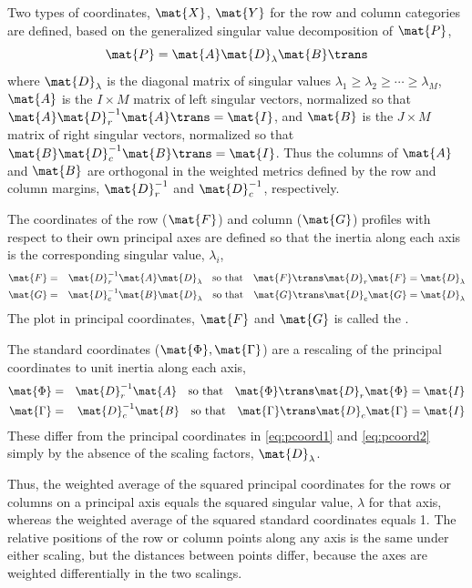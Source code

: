 \documentclass[11pt]{book}\usepackage[]{graphicx}\usepackage[]{color}
\begin{document}
Two types of coordinates, $\mat{X}$, $\mat{Y}$ for the row and column categories are defined,
based on the generalized singular value decomposition of $\mat{P}$,
\begin{equation*}%
\mat{P} = \mat{A} \mat{D}_{\lambda} \mat{B}\trans
\end{equation*}
where $\mat{D}_{\lambda}$ is the diagonal matrix of singular values
\(\lambda_1 \geq \lambda_2 \geq \cdots \geq \lambda_M\),
$\mat{A}$ is the $I \times M$ matrix of left singular vectors,
normalized so that
\( \mat{A} \mat{D}_r^{-1} \mat{A}\trans = \mat{I} \), and
$\mat{B}$ is the $J \times M$ matrix of right singular vectors,
normalized so that
\( \mat{B} \mat{D}_c^{-1} \mat{B}\trans = \mat{I} \).
Thus the columns of $\mat{A}$ and $\mat{B}$ are orthogonal in the weighted metrics
defined by the row and column margins, $\mat{D}_r^{-1}$ and $\mat{D}_c^{-1}$,
respectively.
\begin{description}
\item[principal coordinates:]  The coordinates of the row ($\mat{F}$) and column ($\mat{G}$) profiles
with respect to their own principal axes are defined so that the inertia along
each axis is the corresponding singular value, $\lambda_i$,
\begin{eqnarray}
%
\mat{F} & = & \mat{D}_r^{-1} \mat{A} \mat{D}_{\lambda} \quad\mbox{so that} \quad \mat{F}\trans \mat{D}_r \mat{F} = \mat{D}_{\lambda} \label{eq:pcoord1} \\
\mat{G} & = & \mat{D}_c^{-1} \mat{B} \mat{D}_{\lambda} \quad\mbox{so that} \quad \mat{G}\trans \mat{D}_c \mat{G} = \mat{D}_{\lambda} \label{eq:pcoord2}
\end{eqnarray}
The plot in principal coordinates, $\mat{F}$ and $\mat{G}$ is called the 
.

\item[standard coordinates:] The standard coordinates ($\mat{\Phi}, \mat{\Gamma}$) are a rescaling of the principal
coordinates to unit inertia along each axis,
\begin{eqnarray}
\mat{\Phi} & = & \mat{D}_r^{-1} \mat{A}  \quad\mbox{so that} \quad \mat{\Phi}\trans \mat{D}_r \mat{\Phi} = \mat{I} \label{eq:scoord1} \\
\mat{\Gamma} & = & \mat{D}_c^{-1} \mat{B} \quad\mbox{so that} \quad \mat{\Gamma}\trans \mat{D}_c \mat{\Gamma} = \mat{I} \label{eq:scoord2}
\end{eqnarray}
These differ from the principal coordinates in \eqref{eq:pcoord1}
and \eqref{eq:pcoord2} simply by the absence of the scaling factors,
$\mat{D}_{\lambda}$.
\end{description}
Thus, the weighted average of the squared principal coordinates
for the rows or columns on a principal axis equals the squared
singular value, $\lambda$ for that axis,
whereas the weighted average of the squared standard coordinates
equals 1.
The relative positions of the row or column points along any axis
is the same under either scaling,
but the distances between points differ, because the axes are
weighted differentially in the two scalings.
\end{document}
